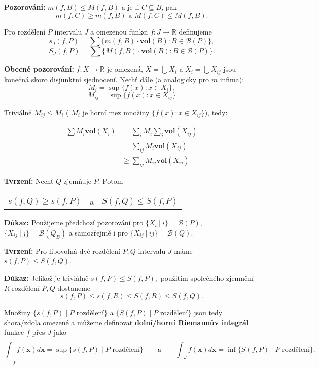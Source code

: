 \documentclass[../main.tex]{subfiles}
\begin{document}
\noindent
\textbf{Pozorování:} $m(f,B) \leq M(f,B)$ a je-li $C \subseteq B$, pak 
\[m(f,C) \geq m(f,B) \text{ a } M(f,C) \leq M(f,B).\]

\noindent
Pro rozdělení $P$ intervalu $J$ a omezenou funkci $f : J \rightarrow \mathbb{R}$ definujeme 
\[s_J(f,P) = \sum \{m(f,B) \cdot \textbf{vol}(B) : B \in \mathcal{B}(P)\},\]
\[S_J(f,P) = \sum \{M(f,B) \cdot \textbf{vol}(B) : B \in \mathcal{B}(P)\}.\]

\noindent
\textbf{Obecné pozorování:} $f: X \rightarrow \mathbb{R}$ je omezená, $X = \bigcup X_i$ a $X_i = \bigcup X_{ij}$ jsou konečná skoro disjunktní sjednocení. Nechť dále (a analogicky pro $m$ infima):
\[M_i = \sup\{f(x) : x \in X_i\},\]
\[M_{ij} = \sup\{f(x) : x \in X_{ij}\}\]

\noindent
Triviálně $M_{ij} \leq M_i$ ( $M_i$ je horní mez množiny $\{f(x) : x \in X_{ij}\}$), tedy:

$$
\begin{aligned}
	\sum M_i \textbf{vol}(X_i) &= \sum_i M_i \sum_j \textbf{vol}(X_{ij}) \\
  &= \sum_{ij}M_i \textbf{vol}(X_{ij}) \\
	&\geq \sum_{ij} M_{ij} \textbf{vol}(X_{ij})
\end{aligned}
$$

\noindent
\textbf{Tvrzení:} Nechť $Q$ zjemňuje $P$. Potom
\begin{center}
    \begin{tabular}{c c c}
        $s(f,Q) \geq s(f,P)$ & a & $S(f,Q) \leq S(f,P)$
    \end{tabular}
\end{center}

\vspace{5mm}
\noindent
\textbf{Důkaz:} Použijeme předchozí pozorování pro $\{X_i\ |\ i\} = \mathcal{B}(P)$, $\{X_{ij}\ |\ j\} = \mathcal{B}(Q_B)$ a samozřejmě
i pro $\{X_{ij}\ |\ ij\} = \mathcal{B}(Q).$

\vspace{5mm}
\noindent
\textbf{Tvrzení:} Pro libovolná dvě rozdělení $P,Q$ intervalu $J$ máme $s(f,P) \leq S(f,Q)$.

\vspace{5mm}
\noindent
\textbf{Důkaz:} Jelikož je triviálně $s(f,P) \leq S(f,P),$ použitím společného zjemnění $R$ rozdělení $P,Q$ dostaneme
\[s(f,P) \leq s(f,R) \leq S(f,R) \leq S(f,Q).\]

\vspace{5mm}
\noindent
Množiny $\{s(f,P) \mid P \text{ rozdělení}\}$ a $\{S(f,P) \mid P \text{ rozdělení}\}$ jsou tedy shora/zdola omezené a můžeme definovat \textbf{dolní/horní Riemannův integrál} funkce $f$ přes $J$ jako
\[\underline{\int}_J f(\textbf{x})d\textbf{x} = \sup\{s(f,P) \mid P \text{ rozdělení}\} \qquad \text{a} \qquad
\overline{\int}_J f(\textbf{x})d\textbf{x} = \inf\{S(f,P) \mid P \text{ rozdělení}\}.\]
\end{document}
